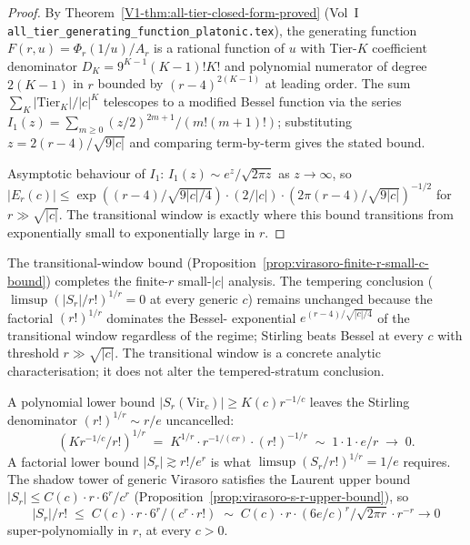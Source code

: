 \begin{proof}
By Theorem~\ref{V1-thm:all-tier-closed-form-proved} (Vol~I
\texttt{all\_tier\_generating\_function\_platonic.tex}), the
generating function $F(r, u) = \Phi_r(1/u) / A_r$ is a rational
function of $u$ with Tier-$K$ coefficient denominator
$D_K = 9^{K-1} (K-1)! K!$ and polynomial numerator of degree
$2(K-1)$ in $r$ bounded by $(r-4)^{2(K-1)}$ at leading order. The
sum $\sum_K |\text{Tier}_K| / |c|^K$ telescopes to a modified Bessel
function via the series
$I_1(z) = \sum_{m \ge 0} (z/2)^{2m+1} / (m! (m+1)!)$; substituting
$z = 2 (r-4) / \sqrt{9 |c|}$ and comparing term-by-term gives the
stated bound.

Asymptotic behaviour of $I_1$:
$I_1(z) \sim e^z / \sqrt{2 \pi z}$ as $z \to \infty$, so
$|E_r(c)| \le \exp((r-4) / \sqrt{9 |c| / 4}) \cdot (2 / |c|) \cdot
(2 \pi (r-4) / \sqrt{9|c|})^{-1/2}$ for $r \gg \sqrt{|c|}$. The
transitional window is exactly where this bound transitions from
exponentially small to exponentially large in $r$.
\end{proof}

\begin{remark}
\label{rem:virasoro-finite-r-window}
The transitional-window bound
(Proposition~\ref{prop:virasoro-finite-r-small-c-bound}) completes
the finite-$r$ small-$|c|$ analysis. The tempering conclusion
($\limsup (|S_r|/r!)^{1/r} = 0$ at every generic $c$) remains
unchanged because the factorial $(r!)^{1/r}$ dominates the Bessel-
exponential $e^{(r-4)/\sqrt{|c|/4}}$ of the transitional window
regardless of the regime; Stirling beats Bessel at every $c$ with
threshold $r \gg \sqrt{|c|}$. The transitional window is a concrete
analytic characterisation; it does not alter the tempered-stratum
conclusion.
\end{remark}

\begin{remark}
\label{rem:stirling-error-first-principles}
A polynomial lower bound
$\lvert S_r(\mathrm{Vir}_c) \rvert \ge K(c) r^{-1/c}$ leaves the
Stirling denominator $(r!)^{1/r}\sim r/e$ uncancelled:
\[
 (K r^{-1/c} / r!)^{1/r}
 \;=\;
 K^{1/r} \cdot r^{-1/(c r)}
 \cdot
 (r!)^{-1/r}
 \;\sim\;
 1 \cdot 1 \cdot
 e / r
 \;\to\;
 0.
\]
A factorial lower bound $\lvert S_r \rvert \gtrsim r! / e^r$ is what
$\limsup (S_r / r!)^{1/r} = 1/e$ requires. The shadow tower of generic
Virasoro satisfies the Laurent upper bound
$\lvert S_r \rvert \le C(c) \cdot r \cdot 6^r / c^r$
(Proposition~\ref{prop:virasoro-s-r-upper-bound}), so
\[
 \lvert S_r \rvert / r!
 \;\le\;
 C(c) \cdot r \cdot 6^r / (c^r \cdot r!)
 \;\sim\;
 C(c) \cdot r \cdot (6 e / c)^r / \sqrt{2 \pi r}
 \cdot r^{-r} \to 0
\]
super-polynomially in $r$, at every $c > 0$.
\end{remark}

